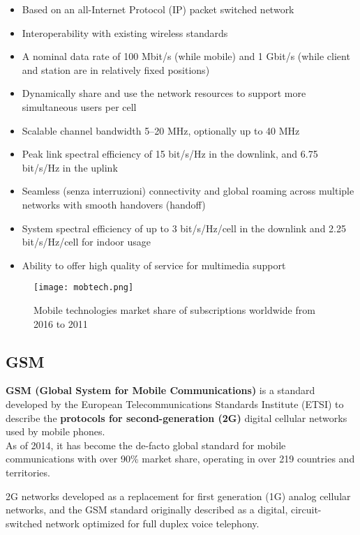 \begin{itemize}
  \item Based on an all-Internet Protocol (IP) packet switched network
  \item Interoperability with existing wireless standards
  \item A nominal data rate of 100 Mbit/s (while mobile) and 1 Gbit/s (while
client and station are in relatively fixed positions)
  \item Dynamically share and use the network resources to support more
simultaneous users per cell
  \item Scalable channel bandwidth 5–20 MHz, optionally up to 40 MHz
  \item Peak link spectral efficiency of 15 bit/s/Hz in the downlink, and 6.75
bit/s/Hz in the uplink
  \item Seamless (senza interruzioni) connectivity and global roaming across
multiple networks with smooth handovers (handoff)
  \item System spectral efficiency of up to 3 bit/s/Hz/cell in the downlink and
2.25 bit/s/Hz/cell for indoor usage
  \item Ability to offer high quality of service for multimedia support
\end{itemize}

\begin{figure}[H]
  \centering
  \texttt{[image: mobtech.png]}
  \caption{Mobile technologies market share of subscriptions worldwide from
  2016 to 2011}
  \label{fig:mobtech}
\end{figure}

\subsection{GSM}

\textbf{GSM (Global System for Mobile Communications)} is a standard
developed by the European Telecommunications Standards Institute (ETSI) to
describe the \textbf{protocols for second-generation (2G)} digital cellular
networks used by mobile phones. \\

As of 2014, it has become the de-facto global standard for mobile
communications with over 90\% market share, operating in over 219 countries
and territories.

2G networks developed as a replacement for first generation (1G) analog
cellular networks, and the GSM standard originally described as a digital,
circuit-switched network optimized for full duplex voice telephony. \\

